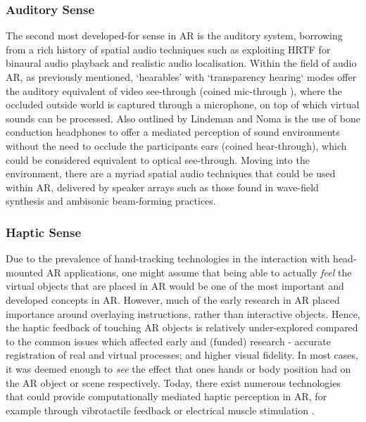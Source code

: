 \subsubsection{Auditory Sense}\label{sec: literature-interface-sensory-auditory}
The second most developed-for sense in AR is the auditory system, borrowing from a rich history of spatial audio techniques such as exploiting HRTF for binaural audio playback and realistic audio localisation. Within the field of audio AR, as previously mentioned, `hearables' with `transparency hearing` modes offer the auditory equivalent of video see-through (coined mic-through \citep{lindeman2008}), where the occluded outside world is captured through a microphone, on top of which virtual sounds can be processed. Also outlined by Lindeman and Noma is the use of bone conduction headphones to offer a mediated perception of sound environments without the need to occlude the participants ears (coined hear-through), which could be considered equivalent to optical see-through. Moving into the environment, there are a myriad spatial audio techniques that could be used within AR, delivered by speaker arrays such as those found in wave-field synthesis and ambisonic beam-forming practices.

\subsubsection{Haptic Sense}\label{sec: literature-interface-sensory-haptic}
Due to the prevalence of hand-tracking technologies in the interaction with head-mounted AR applications, one might assume that being able to actually \textit{feel} the virtual objects that are placed in AR would be one of the most important and developed concepts in AR. However, much of the early research in AR placed importance around overlaying instructions, rather than interactive objects. Hence, the haptic feedback of touching AR objects is relatively under-explored compared to the common issues which affected early and (funded) research - accurate registration of real and virtual processes; and higher visual fidelity. In most cases, it was deemed enough to \textit{see} the effect that ones hands or body position had on the AR object or scene respectively. Today, there exist numerous technologies that could provide computationally mediated haptic perception in AR, for example through vibrotactile feedback or electrical muscle stimulation \citep{lopes2018}.

